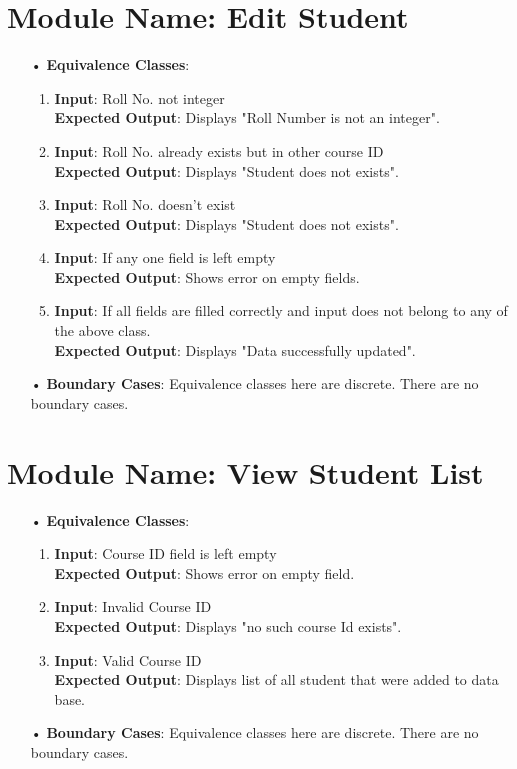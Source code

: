 \documentclass{scrreprt}
\begin{document}
\section{Module Name: Edit Student}
\begin{itemize}
\item[•]\textbf{Equivalence Classes}:
\begin{enumerate}
\item \textbf{Input}: Roll No. not integer \\
\textbf{Expected Output}: Displays "Roll Number is not an integer".
\item \textbf{Input}:  Roll No. already exists but in other course ID\\
\textbf{Expected Output}: Displays "Student does not exists".
\item \textbf{Input}:  Roll No. doesn't exist\\
\textbf{Expected Output}:  Displays "Student does not exists".
\item \textbf{Input}: If any one field is left empty\\
\textbf{Expected Output}: Shows error on empty fields.
\item \textbf{Input}: If all fields are filled correctly and input does not belong to any of the above class.\\
\textbf{Expected Output}: Displays "Data successfully updated".
\end{enumerate}
\item[•]\textbf{Boundary Cases}: Equivalence classes here are discrete. There are no boundary cases.
\end{itemize}

\section{Module Name: View Student List}
\begin{itemize}
\item[•]\textbf{Equivalence Classes}:
\begin{enumerate}
\item \textbf{Input}: Course ID field is left empty\\
\textbf{Expected Output}: Shows error on empty field.
\item \textbf{Input}: Invalid Course ID\\
\textbf{Expected Output}: Displays "no such course Id exists".
\item \textbf{Input}:  Valid Course ID\\
\textbf{Expected Output}: Displays list of all student that were added to data base.
\end{enumerate}
\item[•]\textbf{Boundary Cases}: Equivalence classes here are discrete. There are no boundary cases.
\end{itemize}
\end{document}

